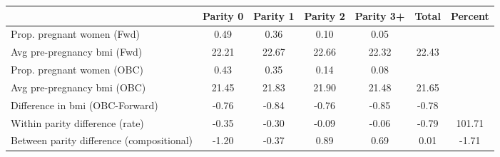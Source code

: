 \begin{tabular}{l*{6}{c}}
\toprule
            &\multicolumn{1}{c}{Parity 0}&\multicolumn{1}{c}{Parity 1}&\multicolumn{1}{c}{Parity 2}&\multicolumn{1}{c}{Parity 3+}&\multicolumn{1}{c}{Total}&\multicolumn{1}{c}{Percent}\\
\midrule
\midrule
Prop. pregnant women (Fwd)&        0.49&        0.36&        0.10&        0.05&            &            \\
Avg pre-pregnancy bmi (Fwd)&       22.21&       22.67&       22.66&       22.32&       22.43&            \\
Prop. pregnant women (OBC)&        0.43&        0.35&        0.14&        0.08&            &            \\
Avg pre-pregnancy bmi (OBC)&       21.45&       21.83&       21.90&       21.48&       21.65&            \\
Difference in bmi (OBC-Forward)&       -0.76&       -0.84&       -0.76&       -0.85&       -0.78&            \\
Within parity difference (rate)&       -0.35&       -0.30&       -0.09&       -0.06&       -0.79&      101.71\\
Between parity difference (compositional)&       -1.20&       -0.37&        0.89&        0.69&        0.01&       -1.71\\
\bottomrule
\end{tabular}
